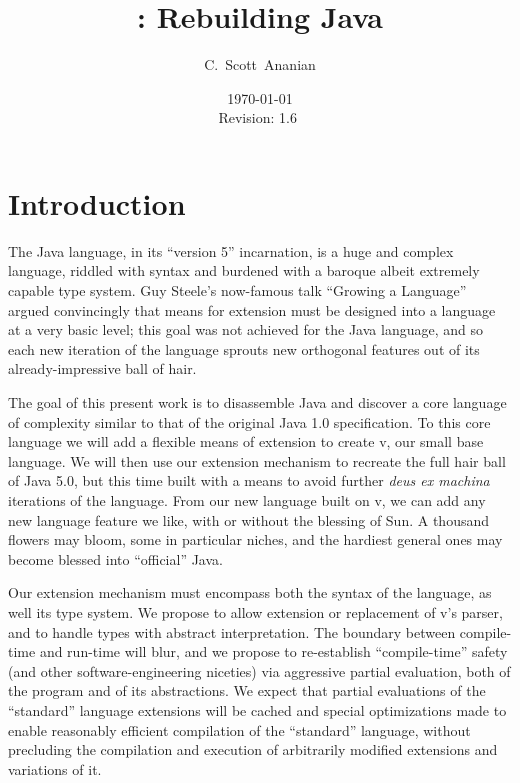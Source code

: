 \documentclass[11pt,notitlepage,twocolumn]{article}
\author{C.~Scott~Ananian}
\title{\vlang: Rebuilding Java}
\date{\today \\ $ $Revision: 1.6 $ $}
\newcommand{\vlang}{\textsf{v}\xspace}
\begin{document}

\maketitle

\section{Introduction}
The Java language, in its ``version 5'' incarnation, is a huge and
complex language, riddled with syntax and burdened with a baroque
albeit extremely capable type system.  Guy Steele's now-famous talk
``Growing a Language'' \cite{Steele99} argued convincingly that means
for extension must be designed into a language at a very basic level;
this goal was not achieved for the Java language, and so each new
iteration of the language sprouts new orthogonal features out of its
already-impressive ball of hair.

The goal of this present work is to disassemble Java and discover a
core language of complexity similar to that of the original Java
1.0 specification.  To this core language we will add a flexible means
of extension to create \vlang, our small base language.  We will then use
our extension mechanism to recreate the full hair ball of Java 5.0,
but this time built with a means to avoid further \emph{deus ex
  machina} iterations of the language.  From our new language built on
\vlang, we can add any new language feature we like, with or without the
blessing of Sun.  A thousand flowers may bloom, some in particular
niches, and the hardiest general ones may become blessed into
``official'' Java.

Our extension mechanism must encompass both the syntax of the
language, as well its type system.  We propose to allow extension or
replacement of \vlang's parser, and to handle types with abstract
interpretation.  The boundary between compile-time and run-time will
blur, and we propose to re-establish ``compile-time'' safety (and
other software-engineering niceties) via aggressive partial
evaluation, both of the program and of its abstractions.  We expect
that partial evaluations of the ``standard'' language extensions will
be cached and special optimizations made to enable reasonably
efficient compilation of the ``standard'' language, without precluding
the compilation and execution of arbitrarily modified extensions and
variations of it.
\end{document}
